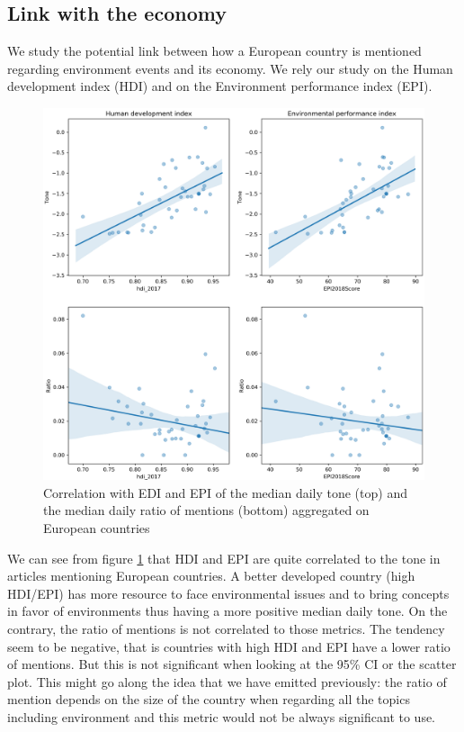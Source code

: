 \documentclass[11pt]{article}
\begin{document}
\subsection{Link with the economy}
We study the potential link between how a European country is mentioned regarding environment events and its economy. We rely our study on the Human development index (HDI) and on the Environment performance index (EPI).
\begin{figure}[h]
   \includegraphics[scale=0.3]{corre_europe.png}
    \caption{\label{corre} Correlation with EDI and EPI of the median daily tone (top) and the median daily ratio of mentions (bottom) aggregated on European countries}
\end{figure}

We can see from figure \ref{corre} that HDI and EPI are quite correlated to the tone in articles mentioning European countries. A better developed country (high HDI/EPI) has more resource to face environmental issues and to bring concepts in favor of environments thus having a more positive median daily tone. On the contrary, the ratio of mentions is not correlated to those metrics. The tendency seem to be negative, that is countries with high HDI and EPI have a lower ratio of mentions. But this is not significant when looking at the 95\% CI or the scatter plot. This might go along the idea that we have emitted previously: the ratio of mention depends on the size of the country when regarding all the topics including environment and this metric would not be always significant to use.
\end{document}

